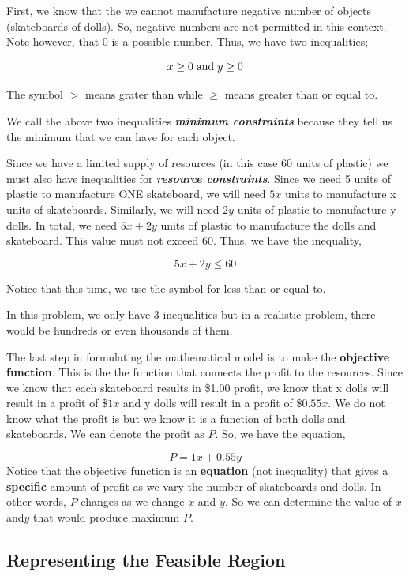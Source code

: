 \documentclass[
  letterpaper,
  DIV=11,
  numbers=noendperiod]{scrreprt}
\begin{document}
First, we know that the we cannot manufacture negative number of objects
(skateboards of dolls). So, negative numbers are not permitted in this
context. Note however, that 0 is a possible number. Thus, we have two
inequalities;

\[x \ge 0 \hspace{.04in} \text{and} \hspace{.04in} y \ge 0\]

The symbol \(>\) means grater than while \(\ge\) means greater than or
equal to.

We call the above two inequalities \textbf{\emph{minimum constraints}}
because they tell us the minimum that we can have for each object.

Since we have a limited supply of resources (in this case 60 units of
plastic) we must also have inequalities for \textbf{\emph{resource
constraints}}. Since we need 5 units of plastic to manufacture ONE
skateboard, we will need \(5x\) units to manufacture x units of
skateboards. Similarly, we will need \(2y\) units of plastic to
manufacture y dolls. In total, we need \(5x+2y\) units of plastic to
manufacture the dolls and skateboard. This value must not exceed 60.
Thus, we have the inequality,

\[5x+2y\le60\]

Notice that this time, we use the symbol for less than or equal to.

In this problem, we only have 3 inequalities but in a realistic problem,
there would be hundreds or even thousands of them.

The last step in formulating the mathematical model is to make the
\textbf{objective function}. This is the the function that connects the
profit to the resources. Since we know that each skateboard results in
\$1.00 profit, we know that x dolls will result in a profit of \(\$1x\)
and y dolls will result in a profit of \(\$0.55x\). We do not know what
the profit is but we know it is a function of both dolls and
skateboards. We can denote the profit as \(P\). So, we have the
equation,

\[P=1x+0.55y\] Notice that the objective function is an
\textbf{equation} (not inequality) that gives a \textbf{specific} amount
of profit as we vary the number of skateboards and dolls. In other
words, \(P\) changes as we change \(x\) and \(y\). So we can determine
the value of \(x\) and\(y\) that would produce maximum \(P\).

\hypertarget{representing-the-feasible-region}{%
\subsection{Representing the Feasible
Region}\label{representing-the-feasible-region}}
\end{document}
